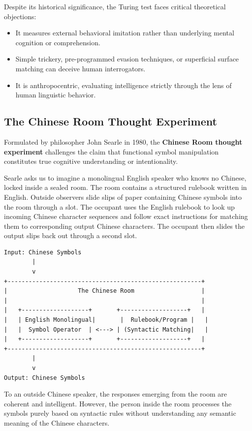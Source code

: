 \documentclass[12pt]{report}
\begin{document}
Despite its historical significance, the Turing test faces critical theoretical objections:
\begin{itemize}
    \item It measures external behavioral imitation rather than underlying mental cognition or comprehension.
    \item Simple trickery, pre-programmed evasion techniques, or superficial surface matching can deceive human interrogators.
    \item It is anthropocentric, evaluating intelligence strictly through the lens of human linguistic behavior.
\end{itemize}

\subsection{The Chinese Room Thought Experiment}

Formulated by philosopher John Searle in 1980, the \textbf{Chinese Room thought experiment} challenges the claim that functional symbol manipulation constitutes true cognitive understanding or intentionality.

Searle asks us to imagine a monolingual English speaker who knows no Chinese, locked inside a sealed room. The room contains a structured rulebook written in English. Outside observers slide slips of paper containing Chinese symbols into the room through a slot. The occupant uses the English rulebook to look up incoming Chinese character sequences and follow exact instructions for matching them to corresponding output Chinese characters. The occupant then slides the output slips back out through a second slot.

\begin{verbatim}
Input: Chinese Symbols
        |
        v
+-------------------------------------------------------+
|                    The Chinese Room                   |
|                                                       |
|   +-------------------+       +-------------------+   |
|   | English Monolingual|       |  Rulebook/Program |   |
|   |  Symbol Operator  | <---> | (Syntactic Matching|   |
|   +-------------------+       +-------------------+   |
+-------------------------------------------------------+
        |
        v
Output: Chinese Symbols
\end{verbatim}

To an outside Chinese speaker, the responses emerging from the room are coherent and intelligent. However, the person inside the room processes the symbols purely based on syntactic rules without understanding any semantic meaning of the Chinese characters.
\end{document}

